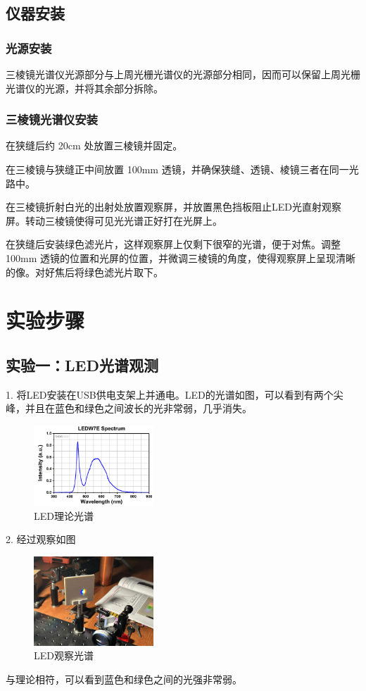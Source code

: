 \documentclass{ctexart}
\begin{document}
\subsection{仪器安装}
\subsubsection{光源安装}
三棱镜光谱仪光源部分与上周光栅光谱仪的光源部分相同，因而可以保留上周光栅光谱仪的光源，并将其余部分拆除。

\subsubsection{三棱镜光谱仪安装}
在狭缝后约 20cm 处放置三棱镜并固定。

在三棱镜与狭缝正中间放置 100mm 透镜，并确保狭缝、透镜、棱镜三者在同一光路中。

在三棱镜折射白光的出射处放置观察屏，并放置黑色挡板阻止LED光直射观察屏。转动三棱镜使得可见光光谱正好打在光屏上。

在狭缝后安装绿色滤光片，这样观察屏上仅剩下很窄的光谱，便于对焦。调整 100mm 透镜的位置和光屏的位置，并微调三棱镜的角度，使得观察屏上呈现清晰的像。对好焦后将绿色滤光片取下。
\section{实验步骤}

\subsection{实验一：LED光谱观测}
1. 将LED安装在USB供电支架上并通电。LED的光谱如图，可以看到有两个尖峰，并且在蓝色和绿色之间波长的光非常弱，几乎消失。
\begin{figure}[H]
    \centering
    \includegraphics[width=0.4\textwidth,height=0.2\textwidth]{pictures/光谱图.png}
    \caption{LED理论光谱}
\end{figure}

2. 经过观察如图
\begin{figure}[H]
    \centering
    \includegraphics[width=0.4\textwidth,height=0.2\textwidth]{pictures/微信图片_20241121154923.jpg}
    \caption{LED观察光谱}
\end{figure}
与理论相符，可以看到蓝色和绿色之间的光强非常弱。
\end{document}
